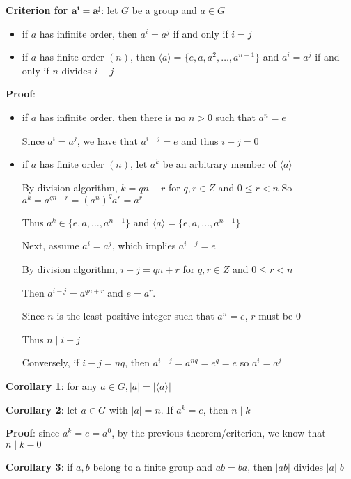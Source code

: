 \documentclass{article}
\begin{document}
  \textbf{Criterion for $\mathbf{a^i = a^j}$}: let $G$ be a group and $a \in G$
  \begin{itemize}
    \item if $a$ has infinite order, then $a^i = a^j$ if and only if $i = j$
    \item if $a$ has finite order $(n)$, then $\langle a \rangle = \{e, a, a^2, \ldots, a^{n-1}\}$ and $a^i = a^j$ if and only if $n$ divides $i -j$
  \end{itemize}

  \textbf{Proof}:
  \begin{itemize}
    \item if $a$ has infinite order, then there is no $n > 0$ such that $a^n = e$

      Since $a^i = a^j$, we have that $a^{i-j} = e$ and thus $i - j = 0$
    \item if $a$ has finite order $(n)$, let $a^k$ be an arbitrary member of $\langle a \rangle$

      By division algorithm, $k = qn + r$ for $q, r \in Z$ and $0 \leq r < n$
      So $a^k = a^{qn + r} = (a^n)^qa^r = a^r$

      Thus $a^k \in \{e, a, \ldots, a^{n-1}\}$ and $\langle a \rangle = \{e, a, \ldots, a^{n-1}\}$

      Next, assume $a^i = a^j$, which implies $a^{i-j} = e$

      By division algorithm, $i -j = qn + r$ for $q, r \in Z$ and $0 \leq r < n$

      Then $a^{i-j} = a^{qn + r}$ and $e = a^r$.

      Since $n$ is the least positive integer such that $a^n = e$, $r$ must be $0$

      Thus $n \mid i - j$

      Conversely, if $i - j = nq$, then $a^{i - j} = a^{nq} = e^q = e$ so $a^i = a^j$
  \end{itemize}

  \bigskip

  \textbf{Corollary 1}: for any $a \in G, |a| = |\langle a \rangle |$

  \textbf{Corollary 2}: let $a \in G$ with $|a| = n$. If $a^k = e$, then $n \mid k$

  \textbf{Proof}: since $a^k = e = a^0$, by the previous theorem/criterion, we know that $n \mid k - 0$
  
  \bigskip

  \textbf{Corollary 3}: if $a, b$ belong to a finite group and $ab = ba$, then $|ab|$ divides $|a||b|$
\end{document}
